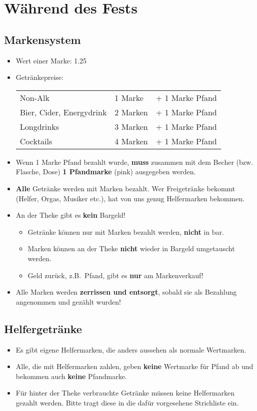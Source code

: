 \section{Während des Fests}
\subsection{Markensystem}
\begin{itemize}
  \item Wert einer Marke: {\large\SI{1.25}{\EUR}}
  \item Getränkepreise:

    \begin{tabular}{lll}
      Non-Alk & 1 Marke & + 1 Marke Pfand \\
      Bier, Cider, Energydrink & 2 Marken & + 1 Marke Pfand \\
      Longdrinks & 3 Marken & + 1 Marke Pfand \\
      Cocktails & 4 Marken & + 1 Marke Pfand
    \end{tabular}
  \item Wenn 1 Marke Pfand bezahlt wurde, \textbf{muss} zusammen mit dem Becher (bzw. Flasche, Dose) \textbf{1 Pfandmarke} (pink) ausgegeben werden.
  \item \textbf{Alle} Getränke werden mit Marken bezahlt. Wer Freigetränke bekommt (Helfer, Orgas, Musiker etc.), hat von uns genug Helfermarken bekommen.
  \item An der Theke gibt es \textbf{kein} Bargeld!
    \begin{itemize}
      \item Getränke können nur mit Marken bezahlt werden, \textbf{nicht} in bar.
      \item Marken können an der Theke \textbf{nicht} wieder in Bargeld umgetauscht werden.
      \item Geld zurück, z.B.\ Pfand, gibt es \textbf{nur} am Markenverkauf!
    \end{itemize}
  \item Alle Marken werden \textbf{zerrissen und entsorgt}, sobald sie als Bezahlung angenommen und gezählt wurden!
\end{itemize}
\subsection{Helfergetränke}
\begin{itemize}
  \item Es gibt eigene Helfermarken, die anders aussehen als normale Wertmarken.
  \item Alle, die mit Helfermarken zahlen, geben \textbf{keine} Wertmarke für Pfand ab und bekommen auch \textbf{keine} Pfandmarke.
  \item Für hinter der Theke verbrauchte Getränke müssen keine Helfermarken gezahlt werden. Bitte tragt diese in die dafür vorgesehene Strichliste ein.
\end{itemize}
